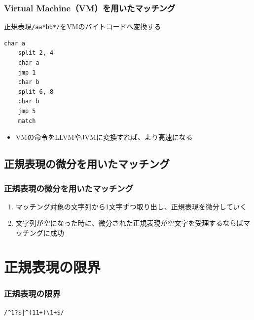 \documentclass[12pt, unicode, svgnames]{beamer}
\begin{document}
\begin{frame}[fragile]
  \frametitle{Virtual Machine（VM）を用いたマッチング}

  正規表現\lstinline|/aa*bb*/|をVMのバイトコードへ変換する
  
  \begin{exampleblock}{}
    \begin{center}
\begin{lstlisting}[style=vm]
    char a
    split 2, 4
    char a
    jmp 1
    char b
    split 6, 8
    char b
    jmp 5
    match
\end{lstlisting}
    \end{center}
  \end{exampleblock}

  \begin{itemize}
    \item<2-> VMの命令をLLVMやJVMに変換すれば、より高速になる
  \end{itemize}
\end{frame}

\subsection{正規表現の微分を用いたマッチング}
\begin{frame}
  \frametitle{正規表現の微分を用いたマッチング}

  
  \begin{enumerate}
    \item<3-> マッチング対象の文字列から1文字ずつ取り出し、正規表現を微分していく
    \item<4-> 文字列が空になった時に、微分された正規表現が空文字を受理するならばマッチングに成功
  \end{enumerate}
\end{frame}

\section{正規表現の限界}
\begin{frame}[fragile]
  \frametitle{正規表現の限界}

  \begin{block}{}
    \centering
    \LARGE
    \lstinline{/^1?$|^(11+)\1+$/}
  \end{block}
\end{frame}
\end{document}
